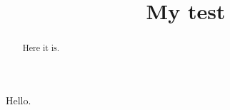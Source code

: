 \documentclass{ximera}
\title{My test}
\begin{document}
\begin{abstract}
  Here it is.
\end{abstract}
\maketitle

Hello.
\end{document}
